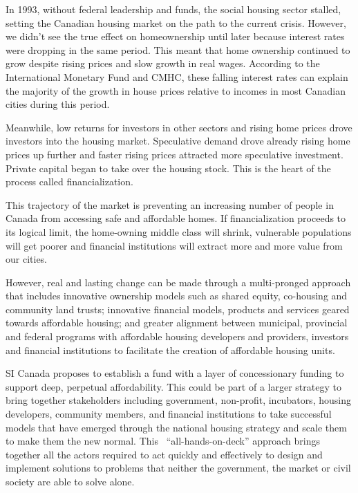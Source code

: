 In 1993, without federal leadership and funds, the social housing sector stalled, setting the Canadian housing market on the path to the current crisis. However, we didn’t see the true effect on homeownership until later because interest rates were dropping in the same period. This meant that home ownership continued to grow despite rising prices and slow growth in real wages. According to the International Monetary Fund and CMHC, these falling interest rates can explain the majority of the growth in house prices relative to incomes in most Canadian cities during this period. 

Meanwhile, low returns for investors in other sectors and rising home prices drove investors into the housing market. Speculative demand drove already rising home prices up further and faster rising prices attracted more speculative investment. Private capital began to take over the housing stock. This is the heart of the process called financialization. 

This trajectory of the market is preventing an increasing number of people in Canada from accessing safe and affordable homes. If financialization proceeds to its logical limit, the home-owning middle class will shrink, vulnerable populations will get poorer and financial institutions will extract more and more value from our cities.

However, real and lasting change can be made through a multi-pronged approach that includes innovative ownership models such as shared equity, co-housing and community land trusts; innovative financial models, products and services geared towards affordable housing; and greater alignment between municipal, provincial and federal programs with affordable housing developers and providers, investors and financial institutions to facilitate the creation of affordable housing units.

SI Canada proposes to establish a fund with a layer of concessionary funding to support deep, perpetual affordability. This could be part of a larger strategy to bring together stakeholders including government, non-profit, incubators, housing developers, community members, and financial institutions to take successful models that have emerged through the national housing strategy and scale them to make them the new normal. This  “all-hands-on-deck” approach brings together all the actors required to act quickly and effectively to design and implement solutions to problems that neither the government, the market or civil society are able to solve alone.  

